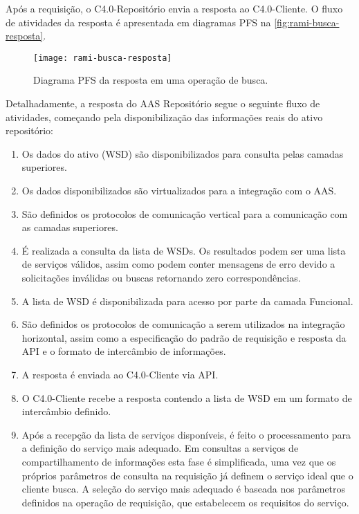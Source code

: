 	Após a requisição, o C4.0-Repositório envia a resposta ao C4.0-Cliente. O fluxo de atividades da resposta é apresentada em diagramas PFS na \autoref{fig:rami-busca-resposta}.

	\begin{figure}[htb]
		\centering
		\caption{Diagrama PFS da resposta em uma operação de busca.}
		\label{fig:rami-busca-resposta}
		\texttt{[image: rami-busca-resposta]}
	\end{figure}

	Detalhadamente, a resposta do AAS Repositório segue o seguinte fluxo de atividades, começando pela disponibilização das informações reais do ativo repositório:
	
	\begin{enumerate}
		\item Os dados do ativo (WSD) são disponibilizados para consulta pelas camadas superiores.
		
		\item Os dados disponibilizados são virtualizados para a integração com o AAS.
		
		\item São definidos os protocolos de comunicação vertical para a comunicação com as camadas superiores.
		
		\item É realizada a consulta da lista de WSDs. Os resultados podem ser uma lista de serviços válidos, assim como podem conter mensagens de erro devido a solicitações inválidas ou buscas retornando zero correspondências.
		
		\item A lista de WSD é disponibilizada para acesso por parte da camada Funcional.
		
		\item São definidos os protocolos de comunicação a serem utilizados na integração horizontal, assim como a especificação do padrão de requisição e resposta da API e o formato de intercâmbio de informações.

		\item A resposta é enviada ao C4.0-Cliente via API.
		
		\item O C4.0-Cliente recebe a resposta contendo a lista de WSD em um formato de intercâmbio definido.
		
		\item Após a recepção da lista de serviços disponíveis, é feito o processamento para a definição do serviço mais adequado. Em consultas a serviços de compartilhamento de informações esta fase é simplificada, uma vez que os próprios parâmetros de consulta na requisição já definem o serviço ideal que o cliente busca. A seleção do serviço mais adequado é baseada nos parâmetros definidos na operação de requisição, que estabelecem os requisitos do serviço.
	\end{enumerate}

